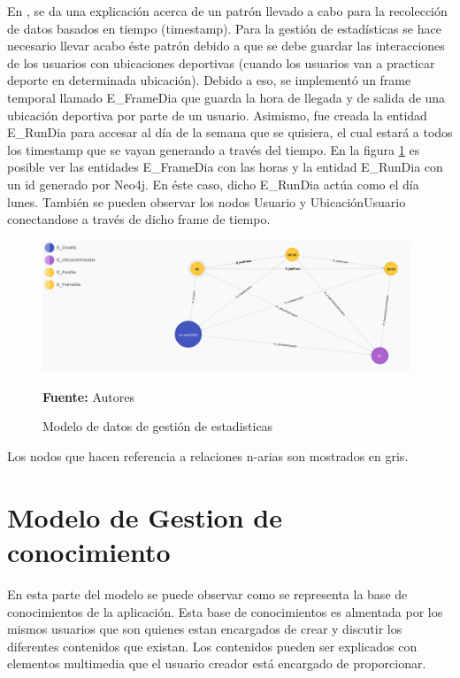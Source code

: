 En \cite{dependent_time_graphs}, se da una explicación acerca de un patrón llevado a cabo para la recolección de datos basados en tiempo (timestamp). Para la gestión de estadísticas se hace necesario llevar acabo éste patrón debido a que se debe guardar las interacciones de los usuarios con ubicaciones deportivas (cuando los usuarios van a practicar deporte en determinada ubicación). Debido a eso, se implementó un frame temporal llamado E\_FrameDia que guarda la hora de llegada y de salida de una ubicación deportiva por parte de un usuario. Asimismo, fue creada la entidad E\_RunDia para accesar al día de la semana que se quisiera, el cual estará a todos los timestamp que se vayan generando a través del tiempo. En la figura \ref{fig:modelo_datos_gestion_estadisticas} es posible ver las entidades E\_FrameDia con las horas y la entidad E\_RunDia con un id generado por Neo4j. En éste caso, dicho E\_RunDia actúa como el día lunes. También se pueden observar los nodos Usuario y UbicaciónUsuario conectandose a través de dicho frame de tiempo.

\begin{figure}[!htb]
  \begin{center}
    \includegraphics[width=11cm]{./imagenes/Modelo_de_datos/Gestion_estadisticas.png}
    \caption{Modelo de datos de gestión de estadisticas}
    \label{fig:modelo_datos_gestion_estadisticas}
    \textbf{Fuente:}  Autores
  \end{center}
\end{figure}

Los nodos que hacen referencia a relaciones n-arias son mostrados en gris.

\section{Modelo de Gestion de conocimiento}

En esta parte del modelo se puede observar como se representa la base de conocimientos de la aplicación. Esta base de conocimientos es almentada por los mismos usuarios que son quienes estan encargados de crear y discutir los diferentes contenidos que existan. Los contenidos pueden ser explicados con elementos multimedia que el usuario creador está encargado de proporcionar.

